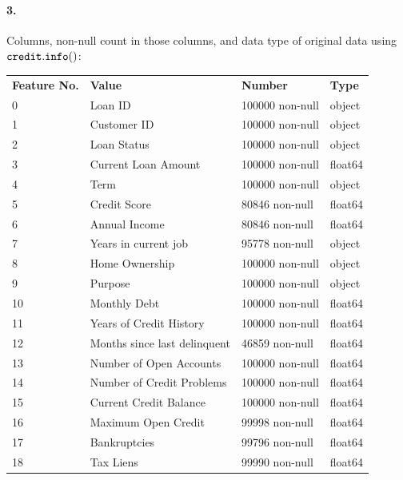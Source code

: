 \documentclass[12pt]{article}
\begin{document}
\paragraph{3.} Columns, non-null count in those columns, and data type of original data using $\tt credit.info()$:
\begin{center}
    \begin{tabular}{l l l l}
    \rowcolor{gray!50}
	\textbf{Feature No.} & \textbf{Value} & \textbf{Number} & \textbf{Type} \\	%
 0  & Loan ID                  &     100000 non-null &  object \\
 1   &Customer ID               &    100000 non-null & object \\
 2  & Loan Status               &    100000 non-null & object  \\
 3  & Current Loan Amount       &    100000 non-null & float64 \\
 4  & Term                      &    100000 non-null & object \\
 5  & Credit Score              &    80846 non-null  & float64\\
 6  & Annual Income             &    80846 non-null  & float64\\
 7  & Years in current job      &    95778 non-null  & object \\
 8  & Home Ownership            &    100000 non-null & object \\
 9  & Purpose                   &    100000 non-null & object \\
 10 & Monthly Debt              &    100000 non-null & float64\\
 11 & Years of Credit History   &    100000 non-null & float64\\
 12 & Months since last delinquent & 46859 non-null  & float64\\
 13 & Number of Open Accounts   &    100000 non-null & float64\\
 14 & Number of Credit Problems  &   100000 non-null & float64\\
 15 & Current Credit Balance     &   100000 non-null & float64\\
 16 & Maximum Open Credit        &   99998 non-null  & float64\\
 17 & Bankruptcies               &   99796 non-null  & float64\\
 18 & Tax Liens                  &   99990 non-null  & float64\\
    \end{tabular}
\end{center}
\end{document}
